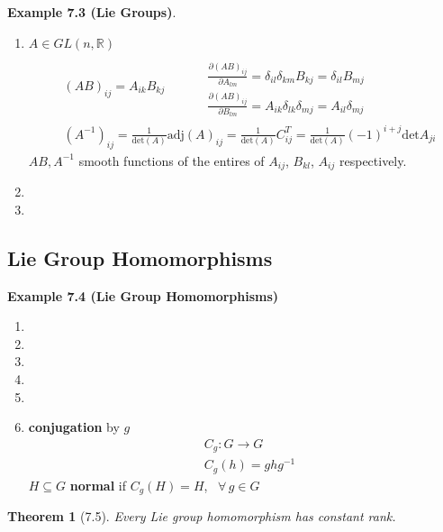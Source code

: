 \documentclass[11pt]{amsart}
\newtheorem{theorem}{Theorem}
\theoremstyle{definition}
\begin{document}
\textbf{Example 7.3 (Lie Groups)}.
\begin{enumerate}
\item[(a)]$A \in GL(n,\mathbb{R})$
\[
\begin{aligned}
  & (AB)_{ij} = A_{ik} B_{kj} \quad \quad \, \begin{aligned} & \quad \\
    & \frac{ \partial (AB)_{ij} }{ \partial A_{lm} } = \delta_{il} \delta_{km} B_{kj} = \delta_{il} B_{mj} \\
    & \frac{ \partial (AB)_{ij} }{ \partial B_{lm} } = A_{ik} \delta_{lk} \delta_{mj} = A_{il} \delta_{mj} \end{aligned} \\
  & (A^{-1})_{ij} = \frac{1}{ \text{det}(A)} \text{adj}(A)_{ij} = \frac{1}{ \text{det}(A) } C^T_{ij} = \frac{1}{ \text{det}(A)}(-1)^{i+j}\text{det}A_{ji}
\end{aligned}
\]
$AB,A^{-1}$ smooth functions of the entires of $A_{ij}$, $B_{kl}$, $A_{ij}$ respectively.
\item[(b)]
\item[(c)]
\end{enumerate}

\subsection*{Lie Group Homomorphisms}

\textbf{Example 7.4 (Lie Group Homomorphisms)}

\begin{enumerate}
\item[(a)]
\item[(b)]
\item[(c)]
\item[(d)]
\item[(e)]
\item[(f)] \textbf{conjugation} by $g$
\[
\begin{aligned}
  & C_g : G \to G \\
  & C_g(h) = ghg^{-1}
\end{aligned}
\]
$H \subseteq G$ \textbf{normal} if $C_g(H) = H$, \, $\forall \, g \in G$
\end{enumerate}

\begin{theorem}[7.5]
  Every Lie group homomorphism has constant rank.
\end{theorem}
\end{document}
